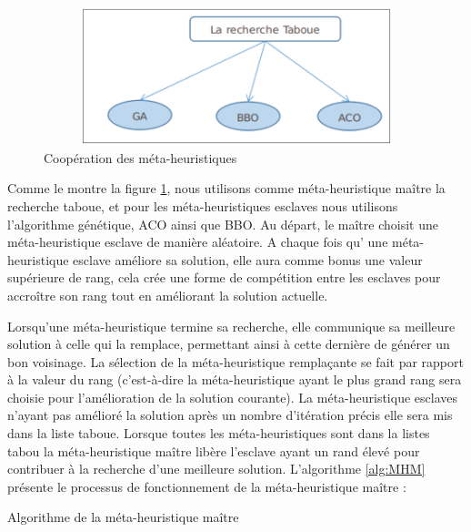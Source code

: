 \begin{figure}[H]
	\centering
	\includegraphics[width=13cm,height=4cm]{Chap4/3.png}
	\caption{Coopération des méta-heuristiques}
	\label{fig:CMH}
\end{figure}


Comme le montre la figure \ref{fig:CMH}, nous utilisons comme méta-heuristique maître la recherche taboue, et pour les méta-heuristiques esclaves nous utilisons l’algorithme génétique, ACO ainsi que BBO. Au départ, le maître choisit une méta-heuristique esclave de manière aléatoire. A chaque fois qu' une méta-heuristique esclave améliore sa solution, elle aura comme bonus une valeur supérieure de rang, cela crée une forme de compétition entre les esclaves pour accroître son rang tout en améliorant la solution actuelle.

Lorsqu'une méta-heuristique termine sa recherche, elle communique sa meilleure solution à celle qui la remplace, permettant ainsi à cette dernière de générer un bon voisinage. La sélection de la méta-heuristique remplaçante se fait par rapport à la valeur du rang (c’est-à-dire la méta-heuristique ayant le plus grand rang sera choisie pour l’amélioration de la solution courante). La méta-heuristique esclaves n’ayant pas amélioré la solution après un nombre d’itération  précis  elle sera mis dans la liste taboue. Lorsque toutes les méta-heuristiques sont dans la listes tabou la méta-heuristique maître libère l’esclave ayant un rand élevé pour contribuer à la recherche d’une meilleure solution. L'algorithme \ref{alg:MHM} présente le processus de fonctionnement de la méta-heuristique maître :\\


\begin{algorithm}[H]
\label{alg:MHM}
\caption{Algorithme de la méta-heuristique maître}
\SetAlgoLined
\DontPrintSemicolon
\large

\end{algorithm}


